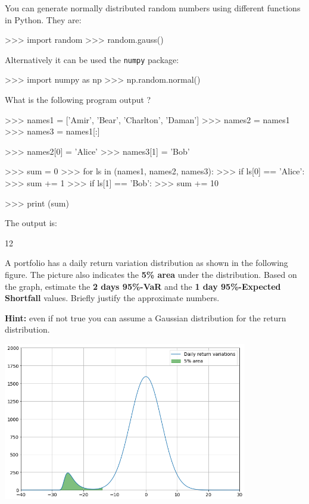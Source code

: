 \documentclass[12pt,a4paper]{exam}
\begin{document}
\begin{questions}
\begin{solution}
You can generate normally distributed random numbers using different functions in Python. They are:

\begin{ipython}
>>> import random
>>> random.gauss()
\end{ipython}

Alternatively it can be used the \texttt{numpy} package:

\begin{ipython}
>>> import numpy as np
>>> np.random.normal()
\end{ipython}
\end{solution}

\question What is the following program output ?
\begin{ipython}
>>> names1 = ['Amir', 'Bear', 'Charlton', 'Daman']
>>> names2 = names1
>>> names3 = names1[:]

>>> names2[0] = 'Alice'
>>> names3[1] = 'Bob'

>>> sum = 0
>>> for ls in (names1, names2, names3):
>>> 	if ls[0] == 'Alice':
>>>    		sum += 1
>>> 	if ls[1] == 'Bob':
>>>    		sum += 10

>>> print (sum)
\end{ipython}
\makeemptybox{3cm}

\begin{solution}
The output is:
\begin{ioutput}
12
\end{ioutput}
\end{solution}

\question A portfolio has a daily return variation distribution as shown in the following figure. The picture also indicates the \textbf{5\% area} under the distribution. 
Based on the graph, estimate the \textbf{2 days 95\%-VaR} and the \textbf{1 day 95\%-Expected Shortfall} values. 
Briefly justify the approximate numbers.

\textbf{Hint:} even if not true you can assume a Gaussian distribution for the return distribution.

\begin{center}
\includegraphics[width=0.8\textwidth]{var}
\end{center}
\makeemptybox{3cm}


\end{questions}
\end{document}
